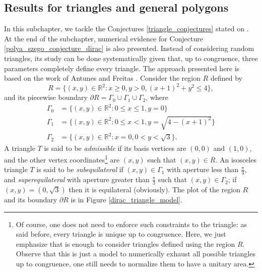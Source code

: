 \subsection{Results for triangles and general polygons}

In this subchapter, we tackle the Conjectures \ref{triangle_conjectures} stated on \cite{vu2023spectral}. At the end of the subchapter, numerical evidence for Conjecture \ref{polya_szego_conjecture_dirac} is also presented. Instead of considering random triangles, its study can be done systematically given that, up to congruence, three parameters completely define every triangle. The approach presented here is based on the work of Antunes and Freitas \cite{antunes2011inverse}. Consider the region \(R\) defined by
\[
    R = \{(x, y) \in \mathbb{R}^2: x \geq 0, y > 0, (x+1)^2 + y^2 \leq 4\},
\]
and its piecewise boundary \(\partial R = \Gamma_0 \cup \Gamma_1 \cup \Gamma_2\), where
\begin{align*}
    \Gamma_0 &= \{(x,y) \in \mathbb{R}^2: 0 \leq x \leq 1, y=0\}\\
    \Gamma_1 &= \{(x,y) \in \mathbb{R}^2: 0 \leq x < 1, y=\sqrt{4-(x+1)^2}\}\\
    \Gamma_2 &= \{(x,y) \in \mathbb{R}^2: x=0, 0 < y < \sqrt{3}\}.
\end{align*}
A triangle \(T\) is said to be \textit{admissible} if its basis vertices are \((0, 0)\) and \((1, 0)\), and the other vertex coordinates\footnote{Of course, one does not need to enforce such constraints to the triangle: as said before, every triangle is unique up to congruence. Here, we just emphasize that is enough to consider triangles defined using the region \(R\). Observe that this is just a model to numerically exhaust all possible triangles up to congruence, one still needs to normalize them to have a unitary area.} are \((x,y)\) such that \((x,y) \in \overline{R}\). An isosceles triangle \(T\) is said to be \textit{subequilateral} if \((x, y) \in \Gamma_1\) with aperture less
than \(\frac{\pi}{3}\), and \textit{superequilateral} with aperture greater
than \(\frac{\pi}{3}\) such that \((x, y) \in \Gamma_2\); if \((x, y) = (0, \sqrt{3})\) then it is equilateral (obviously). The plot of the region \(R\) and its boundary \(\partial R\) is in Figure \ref{dirac_triangle_model}.

